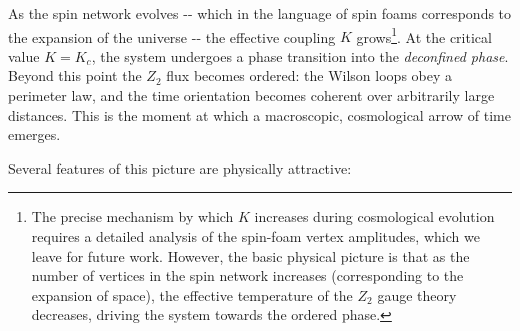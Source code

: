 As the spin network evolves -\/- which in the language of spin foams corresponds to the expansion of the universe -\/- the effective coupling \(K\) grows\footnote{The precise mechanism by which $K$ increases during cosmological evolution requires a detailed analysis of the spin-foam vertex amplitudes, which we leave for future work. However, the basic physical picture is that as the number of vertices in the spin network increases (corresponding to the expansion of space), the effective temperature of the $Z_2$ gauge theory decreases, driving the system towards the ordered phase.}. At the critical value \(K = K_c\), the system undergoes a phase transition into the \emph{deconfined phase}. Beyond this point the \(Z_2\) flux becomes ordered: the Wilson loops obey a perimeter law, and the time orientation becomes coherent over arbitrarily large distances. This is the moment at which a macroscopic, cosmological arrow of time emerges.

Several features of this picture are physically attractive:

